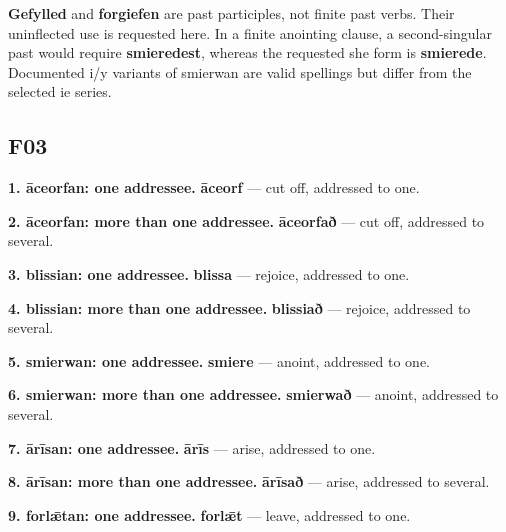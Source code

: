\textbf{Gefylled} and \textbf{forgiefen} are past participles, not finite past verbs. Their uninflected use is requested here. In a finite anointing clause, a second-singular past would require \textbf{smieredest}, whereas the requested she form is \textbf{smierede}. Documented i/\allowbreak{}y variants of smierwan are valid spellings but differ from the selected ie series.

\subsection*{F03}

\textbf{1. āceorfan: one addressee.} \textbf{āceorf} — cut off, addressed to one.

\textbf{2. āceorfan: more than one addressee.} \textbf{āceorfað} — cut off, addressed to several.

\textbf{3. blissian: one addressee.} \textbf{blissa} — rejoice, addressed to one.

\textbf{4. blissian: more than one addressee.} \textbf{blissiað} — rejoice, addressed to several.

\textbf{5. smierwan: one addressee.} \textbf{smiere} — anoint, addressed to one.

\textbf{6. smierwan: more than one addressee.} \textbf{smierwað} — anoint, addressed to several.

\textbf{7. ārīsan: one addressee.} \textbf{ārīs} — arise, addressed to one.

\textbf{8. ārīsan: more than one addressee.} \textbf{ārīsað} — arise, addressed to several.

\textbf{9. forlǣtan: one addressee.} \textbf{forlǣt} — leave, addressed to one.

